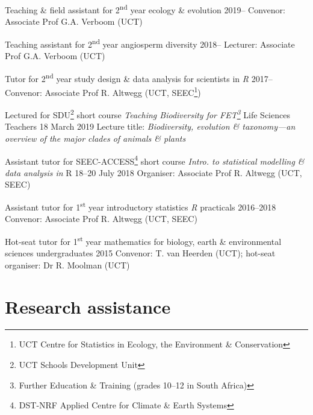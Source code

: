 \documentclass[10pt]{article}
\begin{document}
\begin{hangparas}{2em}{1}

Teaching \& field assistant for 2\textsuperscript{nd} year ecology \& evolution
                                                   \hfill {\small 2019--} \break
Convenor: Associate Prof G.A. Verboom (UCT)

Teaching assistant for 2\textsuperscript{nd} year angiosperm diversity
                                                   \hfill {\small 2018--} \break
Lecturer: Associate Prof G.A. Verboom (UCT)

Tutor for 2\textsuperscript{nd} year study design \& data analysis for 
scientists in \textit{R}                           \hfill {\small 2017--} \break
Convenor: Associate Prof R. Altwegg (UCT, SEEC\footnote{UCT Centre for 
Statistics in Ecology, the Environment \& Conservation})

Lectured for SDU\footnote{UCT Schools Development Unit} short course 
\textit{Teaching Biodiversity for FET\footnote{Further Education \& Training
(grades 10--12 in South Africa)}} Life Sciences Teachers
                                            \hfill {\small 18 March 2019} \break
Lecture title: \textit{Biodiversity, evolution \& taxonomy---an overview of the 
major clades of animals \& plants}

Assistant tutor for SEEC-ACCESS\footnote{DST-NRF Applied Centre for Climate \&
Earth Systems} short course \textit{Intro. to statistical modelling \& data 
analysis in} R                           \hfill {\small 18--20 July 2018} \break
Organiser: Associate Prof R. Altwegg (UCT, SEEC)

Assistant tutor for 1\textsuperscript{st} year introductory statistics
\textit{R} practicals                          \hfill {\small 2016--2018} \break
Convenor: Associate Prof R. Altwegg (UCT, SEEC)

Hot-seat tutor for 1\textsuperscript{st} year mathematics for biology, earth \& 
environmental sciences undergraduates                \hfill {\small 2015} \break
Convenor: T. van Heerden (UCT); hot-seat organiser: Dr R. Moolman (UCT)

\end{hangparas}

\clearpage

\section*{Research assistance} %
\end{document}
